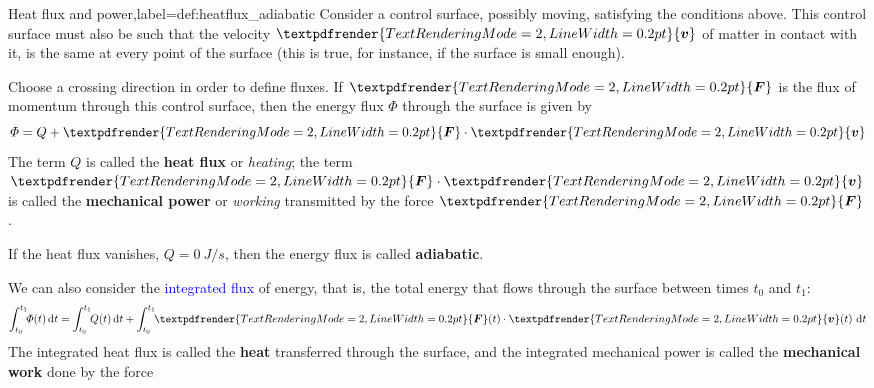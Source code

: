 \documentclass[a4paper,12pt,%
onecolumn,oneside,%
british%
]{memoir}
\renewcommand*{\bm}[1]{\textpdfrender{TextRenderingMode=2,LineWidth=0.2pt}{\boldsymbol{#1}}}
\newcommand*{\di}{\mathrm{d}}%
\renewcommand*{\|}[1][]{\nonscript\:#1\vert\nonscript\:\mathopen{}}
\newcommand*{\sect}{\S}%
\renewcommand*{\autoref}[2]{\sidepar{\vspace{-1ex}\footnotesize{\color{blue}\faIcon{%
angle-right%
}\enskip\sect~\ref{#1} page~\pageref{#1}}}\textcolor{blue}{#2}}
\newcommand*{\yv}{\bm{v}}
\newcommand*{\yti}{t_{0}}
\newcommand*{\ytf}{t_{1}}
\newcommand*{\yH}{\varPhi}%
\newcommand*{\yQ}{Q}%
\newcommand*{\yF}{\bm{F}}
\begin{document}
\begin{definition}{Heat flux and power,label={def:heatflux_adiabatic}}
  Consider a control surface, possibly moving, satisfying the conditions above. This control surface must also be such that the velocity $\yv$ of matter in contact with it, is the same at every point of the surface (this is true, for instance, if the surface is small enough).

  \smallskip

  Choose a crossing direction in order to define fluxes. If $\yF$ is the flux of momentum through this control surface, then the energy flux $\yH$ through the surface is given by
\begin{equation}
  \label{eq:heat_power}
  \yH = \yQ + \yF\cdot \yv
\end{equation}
The term $\yQ$ is called the \textbf{heat flux} or \emph{heating}; the  term $\yF\cdot \yv$ is called the \textbf{mechanical power} or \emph{working} transmitted by the force $\yF$.

\smallskip

If the heat flux vanishes, $\yQ=\qty{0}{J/s}$, then the energy flux is called \textbf{adiabatic}.

\smallskip

We can also consider the \autoref{sec:total_flow}{integrated flux} of energy, that is, the total energy that flows through the surface between times $\yti$ and $\ytf$:
\begin{equation*}
  \int_{\yti}^{\ytf}\!\!\yH(t)\,\di t =
  \int_{\yti}^{\ytf}\!\!\yQ(t)\,\di t
  + \int_{\yti}^{\ytf}\!\!\yF(t)\cdot \yv(t)\ \di t
\end{equation*}
The integrated heat flux is called the \textbf{heat} transferred through the surface, and the integrated mechanical power is called the \textbf{mechanical work} done by the force
\end{definition}
\end{document}
